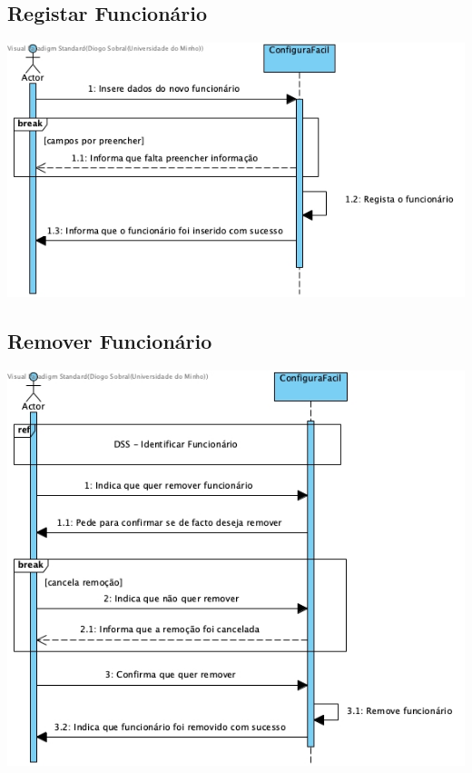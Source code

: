 \subsection{Registar Funcionário}
\begin{center}
 	\includegraphics[width = 5.5in]{DSS/DSS-Registar_funcionario.jpg}
\end{center}

\subsection{Remover Funcionário}
\begin{center}
 	\includegraphics[width = 5.5in]{DSS/DSS-Remover_funcionario.jpg}
\end{center}

